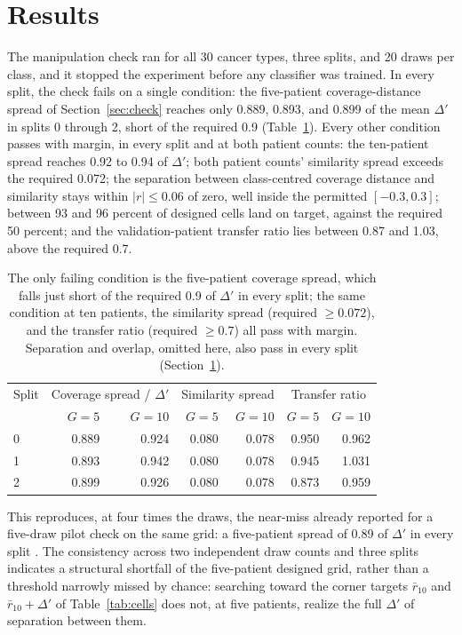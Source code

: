 \section{Results}
\label{sec:results}
The manipulation check ran for all 30 cancer types, three splits, and 20 draws per class, and it stopped the experiment before any classifier was trained. In every split, the check fails on a single condition: the five-patient coverage-distance spread of Section~\ref{sec:check} reaches only 0.889, 0.893, and 0.899 of the mean $\Delta'$ in splits 0 through 2, short of the required 0.9 (Table~\ref{tab:results-check}). Every other condition passes with margin, in every split and at both patient counts: the ten-patient spread reaches 0.92 to 0.94 of $\Delta'$; both patient counts' similarity spread exceeds the required 0.072; the separation between class-centred coverage distance and similarity stays within $|r|\le0.06$ of zero, well inside the permitted $[-0.3,0.3]$; between 93 and 96 percent of designed cells land on target, against the required 50 percent; and the validation-patient transfer ratio lies between 0.87 and 1.03, above the required 0.7.

\begin{table}[htbp]
\centering
\renewcommand{\arraystretch}{1.15}
\begin{tabularx}{\textwidth}{@{}lrrrrrr@{}}
\toprule
Split & \multicolumn{2}{c}{Coverage spread / $\Delta'$} & \multicolumn{2}{c}{Similarity spread} & \multicolumn{2}{c}{Transfer ratio} \\
 & $G=5$ & $G=10$ & $G=5$ & $G=10$ & $G=5$ & $G=10$ \\
\midrule
0 & 0.889 & 0.924 & 0.080 & 0.078 & 0.950 & 0.962 \\
1 & 0.893 & 0.942 & 0.080 & 0.078 & 0.945 & 1.031 \\
2 & 0.899 & 0.926 & 0.080 & 0.078 & 0.873 & 0.959 \\
\bottomrule
\end{tabularx}
\caption{The only failing condition is the five-patient coverage spread, which falls just short of the required 0.9 of $\Delta'$ in every split; the same condition at ten patients, the similarity spread (required $\ge0.072$), and the transfer ratio (required $\ge0.7$) all pass with margin. Separation and overlap, omitted here, also pass in every split (Section~\ref{sec:results}).}
\label{tab:results-check}
\end{table}

\noindent This reproduces, at four times the draws, the near-miss already reported for a five-draw pilot check on the same grid: a five-patient spread of 0.89 of $\Delta'$ in every split \citep{queisler2026coverageSimilarity}. The consistency across two independent draw counts and three splits indicates a structural shortfall of the five-patient designed grid, rather than a threshold narrowly missed by chance: searching toward the corner targets $\bar r_{10}$ and $\bar r_{10}+\Delta'$ of Table~\ref{tab:cells} does not, at five patients, realize the full $\Delta'$ of separation between them.

